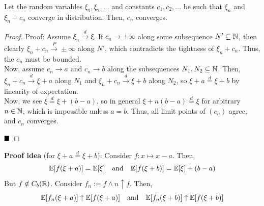 \begin{lemma}
    Let the random variables $\xi_1, \xi_2, \ldots$ and constants $c_1, c_2, \ldots$ be such that $\xi_n$ and $\xi_n + c_n$ converge in distribution. Then, $c_n$ converges.
\end{lemma}
\begin{proof}{Proof:}
    Assume $\xi_n \xrightarrow{d} \xi$. If $c_n \to \pm\infty$ along some subsequence $N' \subseteq \mathbb{N}$, then clearly $\xi_n + c_n \xrightarrow{P} \pm\infty$ along $N'$, which contradicts the tightness of $\xi_n + c_n$. Thus, the $c_n$ must be bounded.\\

    Now, assume $c_n \to a$ and $c_n \to b$ along the subsequences $N_1, N_2 \subseteq \mathbb{N}$. Then, $\xi_n + c_n \xrightarrow{d} \xi + a$ along $N_1$ and $\xi_n + c_n \xrightarrow{d} \xi + b$ along $N_2$, so $\xi + a \overset{d}{=} \xi + b$ by linearity of expectation.\\

    Now, we see $\xi \overset{d}{=} \xi + (b - a)$, so in general $\xi + n(b - a) \overset{d}{=} \xi$ for arbitrary $n \in \mathbb{N}$, which is impossible unless $a = b$. Thus, all limit points of $(c_n)$ agree, and $c_n$ converges.

    $\qed$
\end{proof}

\textbf{Proof idea} (for $\xi + a \overset{d}{=} \xi + b$): Consider $f : x \mapsto x - a$. Then,
\[ \mathbb{E}[f(\xi + a)] = \mathbb{E}[\xi] \quad \text{and} \quad \mathbb{E}[f(\xi + b)] = \mathbb{E}[\xi] + (b - a) \]
But $f \notin C_b(\mathbb{R})$. Consider $f_n := f \wedge n \uparrow f$. Then,
\[ \mathbb{E}[f_n(\xi + a)] \uparrow \mathbb{E}[f(\xi + a)] \quad \text{and} \quad \mathbb{E}[f_n(\xi + b)] \uparrow \mathbb{E}[f(\xi + b)] \]

